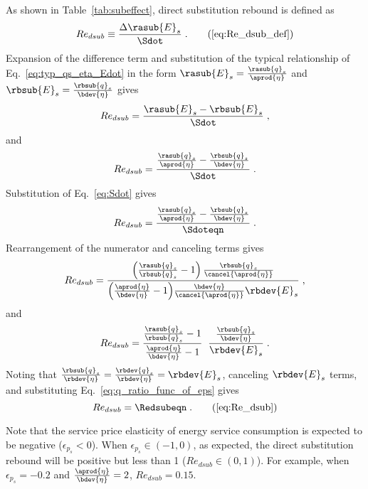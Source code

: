 As shown in Table~\ref{tab:subeffect}, direct substitution rebound is defined as
%
\begin{equation}
  Re_{dsub} \equiv \frac{\Delta \rasub{E}_s}{\Sdot} \; . \tag{\ref{eq:Re_dsub_def}}
\end{equation}
%
Expansion of the difference term and
substitution of the typical relationship of Eq.~\ref{eq:typ_qs_eta_Edot} in the form
$\rasub{E}_s = \frac{\rasub{q}_s}{\aprod{\eta}}$
and
$\rbsub{E}_s = \frac{\rbsub{q}_s}{\bdev{\eta}}$
gives
%
\begin{equation}
   Re_{dsub} = \frac{\rasub{E}_s - \rbsub{E}_s}{\Sdot} \; ,
\end{equation}
%
and
%
\begin{equation}
     Re_{dsub} = \frac{\frac{\rasub{q}_s}{\aprod{\eta}} - \frac{\rbsub{q}_s}{\bdev{\eta}}}{\Sdot} \; .
\end{equation}
%
Substitution of Eq.~\ref{eq:Sdot} gives
%
\begin{equation}
  Re_{dsub} = \frac{\frac{\rasub{q}_s}{\aprod{\eta}} - \frac{\rbsub{q}_s}{\bdev{\eta}}}
              {\Sdoteqn} \; .
\end{equation}
%
Rearrangement of the numerator and canceling terms gives
%
\begin{equation}
  Re_{dsub} = \frac{\left( \frac{\rasub{q}_s}{\rbsub{q}_s} - 1 \right) \frac{\rbsub{q}_s}{\cancel{\aprod{\eta}}} }
              {\left( \frac{\aprod{\eta}}{\bdev{\eta}} - 1 \right)\!\frac{\bdev{\eta}}{\cancel{\aprod{\eta}}} \rbdev{E}_s} \; ,
\end{equation}
%
and
%
\begin{equation}
    Re_{dsub} = \frac{\frac{\rasub{q}_s}{\rbsub{q}_s} - 1}{\frac{\aprod{\eta}}{\bdev{\eta}} - 1} \; \;
                \frac{\frac{\rbsub{q}_s}{\bdev{\eta}}}{\rbdev{E}_s} \; .
\end{equation}
%
Noting that $\frac{\rbsub{q}_s}{\rbdev{\eta}} = \frac{\rbdev{q}_s}{\rbdev{\eta}} = \rbdev{E}_s$,
canceling $\rbdev{E}_s$ terms,
and substituting Eq.~\ref{eq:q_ratio_func_of_eps} gives
%
\begin{equation}
  Re_{dsub} = \Redsubeqn \; . \tag{\ref{eq:Re_dsub}}
\end{equation}

Note that the service price elasticity of energy service consumption is
expected to be negative ($\epsilon_{p_s} < 0$).
When $\epsilon_{p_s} \in (-1, 0)$, as expected,
the direct substitution rebound will be positive but less than 1 ($Re_{dsub} \in (0, 1)$).
For example, when $\epsilon_{p_s} = -0.2$ and $\frac{\aprod{\eta}}{\bdev{\eta}} = 2$,
$Re_{dsub} = 0.15$.

